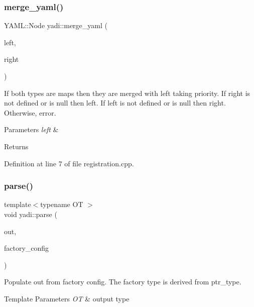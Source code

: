 \mbox{\label{namespaceyadi_a495ab0c09cfb0aba37fd2115350d81d9}} 
\subsubsection{\texorpdfstring{merge\+\_\+yaml()}{merge\_yaml()}}
{\footnotesize\ttfamily Y\+A\+M\+L\+::\+Node yadi\+::merge\+\_\+yaml (\begin{DoxyParamCaption}\item[{Y\+A\+M\+L\+::\+Node const \&}]{left,  }\item[{Y\+A\+M\+L\+::\+Node const \&}]{right }\end{DoxyParamCaption})}

If both types are maps then they are merged with left taking priority. If right is not defined or is null then left. If left is not defined or is null then right. Otherwise, error. 
\begin{DoxyParams}{Parameters}
{\em left} & \\
\hline
\end{DoxyParams}
\begin{DoxyReturn}{Returns}

\end{DoxyReturn}


Definition at line 7 of file registration.\+cpp.

\mbox{\label{namespaceyadi_ace9d761848d60ab00f257fdd9f5f2f21}} 
\subsubsection{\texorpdfstring{parse()}{parse()}}
{\footnotesize\ttfamily template$<$typename OT $>$ \\
void yadi\+::parse (\begin{DoxyParamCaption}\item[{OT \&}]{out,  }\item[{Y\+A\+M\+L\+::\+Node const \&}]{factory\+\_\+config }\end{DoxyParamCaption})}



Populate out from factory config. The factory type is derived from ptr\+\_\+type. 


\begin{DoxyTemplParams}{Template Parameters}
{\em OT} & output type \\
\hline
\end{DoxyTemplParams}

